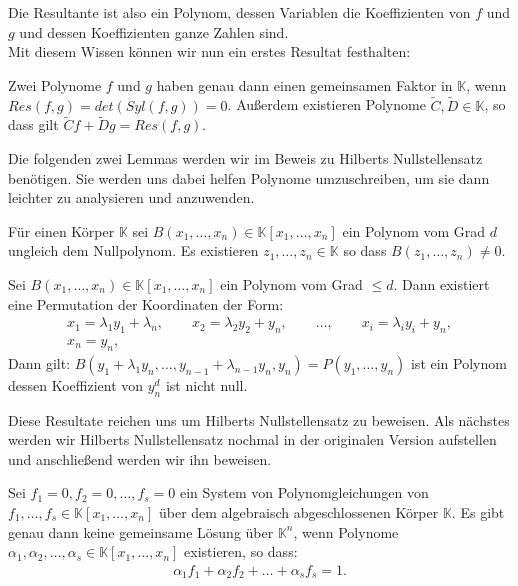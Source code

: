 \noindent Die Resultante ist also ein Polynom, dessen Variablen die Koeffizienten von $f$ und $g$ und dessen Koeffizienten ganze Zahlen sind.\\
\noindent Mit diesem Wissen können wir nun ein erstes Resultat festhalten:

\begin{theorem}
Zwei Polynome $f$ und $g$ haben genau dann einen gemeinsamen Faktor in $\mathbb{K}$, wenn $Res(f,g) = det(Syl(f,g)) = 0$. Außerdem existieren Polynome $\tilde{C},\tilde{D} \in \mathbb{K}$, so dass gilt $\tilde{C}f + \tilde{D}g = Res(f,g)$.
\end{theorem}

\noindent Die folgenden zwei Lemmas werden wir im Beweis zu Hilberts Nullstellensatz benötigen. Sie werden uns dabei helfen Polynome umzuschreiben, um sie dann leichter zu analysieren und anzuwenden.

\begin{lemma}
Für einen Körper $\mathbb{K}$ sei $B(x_1,\ldots,x_n)\in \mathbb{K}[x_1,\ldots,x_n]$ ein Polynom vom Grad $d$ ungleich dem Nullpolynom. Es existieren $z_1,\ldots,z_n \in \mathbb{K}$ so dass $B(z_1,\ldots,z_n) \not = 0$.
\end{lemma}

\begin{lemma}
Sei $B(x_1,\ldots,x_n)\in \mathbb{K}[x_1,\ldots,x_n]$ ein Polynom vom Grad $\le d$. Dann existiert eine Permutation der Koordinaten der Form:
\begin{align*}
x_1 = \lambda_1y_1+\lambda_n, \qquad x_2 = \lambda_2y_2 + y_n, \qquad \ldots, \qquad x_i = \lambda_iy_i+y_n, \\
x_n = y_n,
\end{align*}
Dann gilt: $B(y_1+\lambda_1y_n,\ldots,y_{n-1}+\lambda_{n-1}y_n,y_n) = P(y_1,\ldots,y_n)$ ist ein Polynom dessen Koeffizient von $y_n^d$ ist nicht null.
\end{lemma}

\noindent Diese Resultate reichen uns um Hilberts Nullstellensatz zu beweisen. Als nächstes werden wir Hilberts Nullstellensatz nochmal in der originalen Version aufstellen und anschließend werden wir ihn beweisen.

\begin{theorem}
Sei $f_1 = 0, f_2 = 0, \ldots, f_s = 0$ ein System von Polynomgleichungen von $f_1,\ldots,f_s \in \mathbb{K}[x_1,\ldots,x_n]$ über dem algebraisch abgeschlossenen Körper $\mathbb{K}$. Es gibt genau dann keine gemeinsame Lösung über $\mathbb{K}^n$, wenn Polynome $\alpha_1,\alpha_2,\ldots,\alpha_s \in \mathbb{K}[x_1,\ldots,x_n]$ existieren, so dass:
\begin{align*}
\alpha_1f_1 + \alpha_2f_2+ \ldots + \alpha_sf_s = 1.
\end{align*}
\end{theorem}

